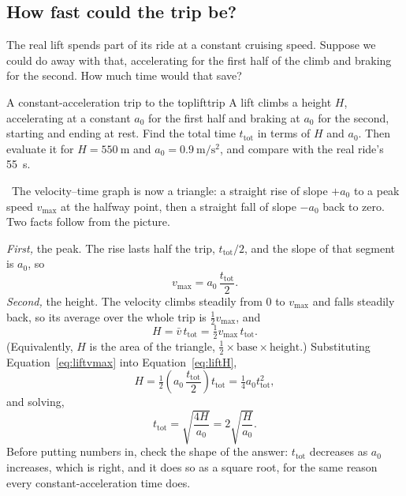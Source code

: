 \documentclass[11pt,twoside,openany]{book}
\newcounter{check}[chapter]
\newcommand{\viewtag}[3]{\fcolorbox{#2}{#3}{\footnotesize\textbf{\textcolor{#2}{#1}}}}
\newcommand{\elemtag}{\viewtag{Elementary}{elemcol}{elempale}}
\newcommand{\elem}{\par\medskip\noindent\elemtag\ }
\begin{document}
\subsection{How fast could the trip be?}

The real lift spends part of its ride at a constant cruising speed. Suppose we could do away with that, accelerating for the first half of the climb and braking for the second. How much time would that save?

\begin{example}{A constant-acceleration trip to the top}{lifttrip}
A lift climbs a height $H$, accelerating at a constant $a_0$ for the first half and braking at $a_0$ for the second, starting and ending at rest. Find the total time $t_{\text{tot}}$ in terms of $H$ and $a_0$. Then evaluate it for $H = \SI{550}{\metre}$ and $a_0 = \SI{0.9}{\metre\per\second\squared}$, and compare with the real ride's \SI{55}{\second}.

\elem The velocity--time graph is now a triangle: a straight rise of slope $+a_0$ to a peak speed $v_{\max}$ at the halfway point, then a straight fall of slope $-a_0$ back to zero. Two facts follow from the picture.

\emph{First,} the peak. The rise lasts half the trip, $t_{\text{tot}}/2$, and the slope of that segment is $a_0$, so
\begin{equation}
v_{\max} = a_0\,\frac{t_{\text{tot}}}{2}.
\label{eq:liftvmax}
\end{equation}
\emph{Second,} the height. The velocity climbs steadily from $0$ to $v_{\max}$ and falls steadily back, so its average over the whole trip is $\tfrac12 v_{\max}$, and
\begin{equation}
H = \bar v\,t_{\text{tot}} = \tfrac12 v_{\max}\,t_{\text{tot}}.
\label{eq:liftH}
\end{equation}
(Equivalently, $H$ is the area of the triangle, $\tfrac12 \times \text{base} \times \text{height}$.) Substituting Equation~\eqref{eq:liftvmax} into Equation~\eqref{eq:liftH},
\[
H = \tfrac12\left(a_0\,\frac{t_{\text{tot}}}{2}\right)t_{\text{tot}} = \tfrac14 a_0 t_{\text{tot}}^2,
\]
and solving,
\begin{equation}
t_{\text{tot}} = \sqrt{\frac{4H}{a_0}} = 2\sqrt{\frac{H}{a_0}}.
\label{eq:lifttime}
\end{equation}
Before putting numbers in, check the shape of the answer: $t_{\text{tot}}$ decreases as $a_0$ increases, which is right, and it does so as a square root, for the same reason every constant-acceleration time does.


\end{example}
\end{document}
